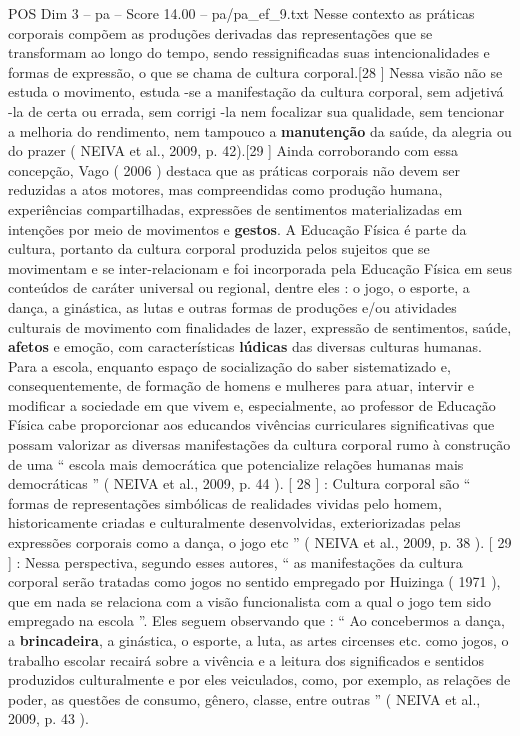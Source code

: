 \begin{textsample}{POS Dim 3 – pa – Score 14.00 – pa/pa\_ef\_9.txt}
Nesse contexto as práticas corporais compõem as produções derivadas das representações que se transformam ao longo do tempo, sendo ressignificadas suas intencionalidades e formas de expressão, o que se chama de cultura corporal.[28 ] Nessa visão não se estuda o movimento, estuda -se a manifestação da cultura corporal, sem adjetivá -la de certa ou errada, sem corrigi -la nem focalizar sua qualidade, sem tencionar a melhoria do rendimento, nem tampouco a \textbf{manutenção} da saúde, da alegria ou do prazer ( NEIVA et al., 2009, p. 42).[29 ] Ainda corroborando com essa concepção, Vago ( 2006 ) destaca que as práticas corporais não devem ser reduzidas a atos motores, mas compreendidas como produção humana, experiências compartilhadas, expressões de sentimentos materializadas em intenções por meio de movimentos e \textbf{gestos}.
A Educação Física é parte da cultura, portanto da cultura corporal produzida pelos sujeitos que se movimentam e se inter-relacionam e foi incorporada pela Educação Física em seus conteúdos de caráter universal ou regional, dentre eles : o jogo, o esporte, a dança, a ginástica, as lutas e outras formas de produções e/ou atividades culturais de movimento com finalidades de lazer, expressão de sentimentos, saúde, \textbf{afetos} e emoção, com características \textbf{lúdicas} das diversas culturas humanas.
Para a escola, enquanto espaço de socialização do saber sistematizado e, consequentemente, de formação de homens e mulheres para atuar, intervir e modificar a sociedade em que vivem e, especialmente, ao professor de Educação Física cabe proporcionar aos educandos vivências curriculares significativas que possam valorizar as diversas manifestações da cultura corporal rumo à construção de uma “ escola mais democrática que potencialize relações humanas mais democráticas ” ( NEIVA et al., 2009, p. 44 ). [ 28 ] : Cultura corporal são “ formas de representações simbólicas de realidades vividas pelo homem, historicamente criadas e culturalmente desenvolvidas, exteriorizadas pelas expressões corporais como a dança, o jogo etc ” ( NEIVA et al., 2009, p. 38 ). [ 29 ] : Nessa perspectiva, segundo esses autores, “ as manifestações da cultura corporal serão tratadas como jogos no sentido empregado por Huizinga ( 1971 ), que em nada se relaciona com a visão funcionalista com a qual o jogo tem sido empregado na escola ”.
Eles seguem observando que : “ Ao concebermos a dança, a \textbf{brincadeira}, a ginástica, o esporte, a luta, as artes circenses etc. como jogos, o trabalho escolar recairá sobre a vivência e a leitura dos significados e sentidos produzidos culturalmente e por eles veiculados, como, por exemplo, as relações de poder, as questões de consumo, gênero, classe, entre outras ” ( NEIVA et al., 2009, p. 43 ).

\end{textsample}
